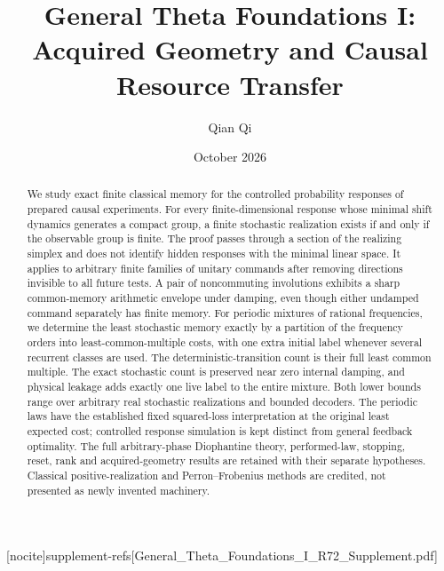 
[nocite]{supplement-refs}[General_Theta_Foundations_I_R72_Supplement.pdf]
\title[Acquired geometry and causal resource transfer]{General Theta Foundations I:\\Acquired Geometry and Causal Resource Transfer}
\author{Qian Qi}\date{October 2026}

\begin{abstract}
We study exact finite classical memory for the controlled probability responses of prepared causal experiments. For every finite-dimensional response whose minimal shift dynamics generates a compact group, a finite stochastic realization exists if and only if the observable group is finite. The proof passes through a section of the realizing simplex and does not identify hidden responses with the minimal linear space. It applies to arbitrary finite families of unitary commands after removing directions invisible to all future tests. A pair of noncommuting involutions exhibits a sharp common-memory arithmetic envelope under damping, even though either undamped command separately has finite memory. For periodic mixtures of rational frequencies, we determine the least stochastic memory exactly by a partition of the frequency orders into least-common-multiple costs, with one extra initial label whenever several recurrent classes are used. The deterministic-transition count is their full least common multiple. The exact stochastic count is preserved near zero internal damping, and physical leakage adds exactly one live label to the entire mixture. Both lower bounds range over arbitrary real stochastic realizations and bounded decoders. The periodic laws have the established fixed squared-loss interpretation at the original least expected cost; controlled response simulation is kept distinct from general feedback optimality. The full arbitrary-phase Diophantine theory, performed-law, stopping, reset, rank and acquired-geometry results are retained with their separate hypotheses. Classical positive-realization and Perron--Frobenius methods are credited, not presented as newly invented machinery.
\end{abstract}
\maketitle









